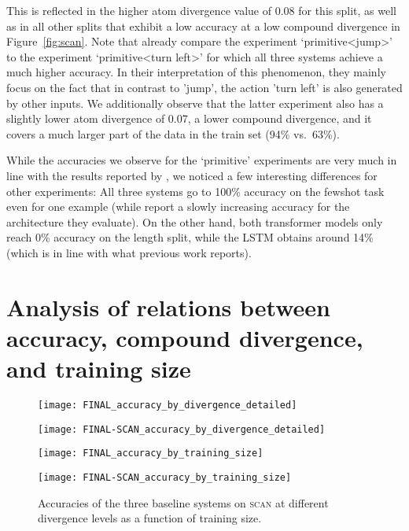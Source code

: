 \documentclass[letterpaper]{article}
\newcommand{\SCAN}{\textsc{scan}}
\begin{document}
\vspace{1ex}
This is reflected in the higher atom divergence value of 0.08 for this split, as well as in all other splits that exhibit a low accuracy at a low compound divergence in Figure~\ref{fig:scan}. Note that \citet{Lake2018GeneralizationWS} already compare the experiment `primitive<jump>' to the experiment `primitive<turn left>' for which all three systems achieve a much higher accuracy. In their interpretation of this phenomenon, they mainly focus on the fact that in contrast to 'jump', the action 'turn left' is also generated by other inputs. We additionally observe that the latter experiment also has a slightly lower atom divergence of 0.07, a lower compound divergence, and it covers a much larger part of the data in the train set (94\% vs.\ 63\%). 

While the accuracies we observe for the `primitive' experiments are very much in line with the results reported by \citet{Lake2018GeneralizationWS}, we noticed a few interesting differences for other experiments:
All three systems go to 100\% accuracy on the fewshot task even for one example (while \citet{rearranging} report a slowly increasing accuracy for the architecture they evaluate). On the other hand, both transformer models only reach 0\% accuracy on the length split, while the LSTM obtains around 14\% (which is in line with what previous work reports).

\section{Analysis of relations between accuracy, compound divergence, and training size}
\label{suppl:trainingsize}

\begin{figure}[!htp]
\centering

\texttt{[image: FINAL\_accuracy\_by\_divergence\_detailed]}
\caption{Accuracies of the three baseline systems on CFQ as a function of compound divergence at different training sizes.}
    \label{fig:trainingsize1}

\bigskip

\texttt{[image: FINAL-SCAN\_accuracy\_by\_divergence\_detailed]}
\caption{Accuracies of the three baseline systems on \SCAN{} as a function of compound divergence at different training sizes.}
    \label{fig:trainingsize-scan1}

\bigskip

\texttt{[image: FINAL\_accuracy\_by\_training\_size]}
\caption{Accuracies of the three baseline systems on CFQ at different divergence levels as a function of training size.}
    \label{fig:trainingsize2}

\bigskip

\texttt{[image: FINAL-SCAN\_accuracy\_by\_training\_size]}
\caption{Accuracies of the three baseline systems on \SCAN{} at different divergence levels as a function of training size.}
    \label{fig:trainingsize-scan2}

\end{figure}
\end{document}
